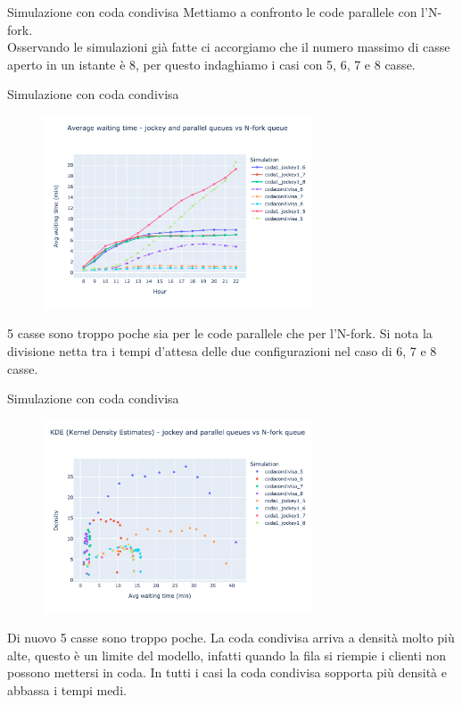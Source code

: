 \begin{frame}{Simulazione con coda condivisa}
	Mettiamo a confronto le code parallele con l'N-fork.\\
	Osservando le simulazioni già fatte ci accorgiamo che il numero massimo di casse aperto in un istante è 8, per questo indaghiamo i casi con 5, 6, 7 e 8 casse.
\end{frame}

\begin{frame}{Simulazione con coda condivisa}
	\begin{figure}[H]
		\centering
		\includegraphics[width=8cm]{"../report/images/results/avg_wt_codacondivisa.png"}
	\end{figure}
	5 casse sono troppo poche sia per le code parallele che per l'N-fork. Si nota la divisione netta tra i tempi d'attesa delle due configurazioni nel caso di 6, 7 e 8 casse.
\end{frame}

\begin{frame}{Simulazione con coda condivisa}
	\begin{figure}[H]
		\centering
		\includegraphics[width=8cm]{"../report/images/results/kde_codacondivisa.png"}
	\end{figure}
	Di nuovo 5 casse sono troppo poche. La coda condivisa arriva a densità molto più alte, questo è un limite del modello, infatti quando la fila si riempie i clienti non possono mettersi in coda. In tutti i casi la coda condivisa sopporta più densità e abbassa i tempi medi.
\end{frame}

